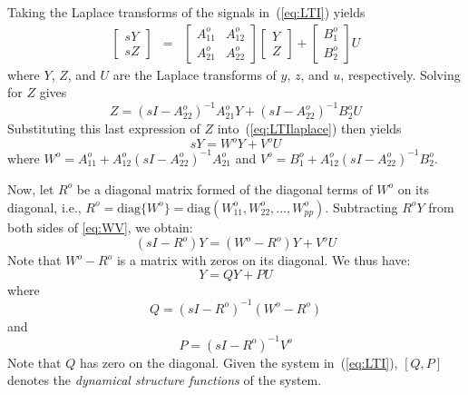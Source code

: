 \documentclass[twocolumn,12pt]{autart}
\theoremstyle{plain}
\begin{document}
Taking the Laplace transforms of the signals in~(\ref{eq:LTI}) yields
\begin{equation}\label{eq:LTIlaplace}
 \begin{array}{lll}
   \left[\begin{array}{c}s{Y}\\s{Z} \end{array}\right]& = & \left[\begin{array}{cc}{A}^o_{11}&{A}^o_{12}\\{A}^o_{21}&{A}^o_{22}\end{array}\right]\left[\begin{array}{c}{Y}\\{Z}\end{array}\right] +\left[\begin{array}{c} {B}^o_{1}\\{B}^o_{2}\end{array}\right]{U}
     \end{array}
\end{equation}
where ${Y}$, ${Z}$, and ${U}$ are the Laplace
transforms of ${y}$, ${z}$, and ${u}$, respectively.
Solving for ${Z}$ gives
$${Z}=\left ( s{I} - {A}^o_{22} \right )^{-1}
{A}^o_{21} {Y} + \left ( s{I} - {A}^o_{22}
\right )^{-1} {B}^o_{2} {U}$$
Substituting this last expression of ${Z}$ into~(\ref{eq:LTIlaplace}) then yields
\begin{equation}
\label{eq:WV} s{Y} = {W}^o {Y} + {V}^o{U}
\end{equation}
where ${W}^o={A}^o_{11} + {A}^o_{12}\left ( s{I} -
  {A}^o_{22} \right )^{-1} {A}^o_{21}$ and
${V}^o={B}^o_{1} +{A}^o_{12}\left ( s{I} - {A}^o_{22} \right
)^{-1} {B}^o_{2}$.

Now, let ${R}^o$ be a
diagonal matrix formed of the diagonal terms of ${W}^o$ on its
diagonal, i.e., ${R}^o=\mbox{diag}\{{W}^o\} =
\mbox{diag}(W^o_{11}, W^o_{22}, ..., W^o_{pp})$. Subtracting ${R}^o{Y}$ from both sides of \eqref{eq:WV}, we obtain:
$$\left ( s{I} - {R}^o \right ) {Y} = \left (
  {W}^o-{R}^o \right ) {Y} + {V}^o {U}$$
Note that ${W}^o-{R}^o$ is a matrix with zeros on its
diagonal. We thus have:
\begin{equation}
  \label{eq:PQ} {Y} =  {QY} + {PU}
\end{equation}
where
\begin{equation}\label{eq:Q}
  {Q} = \left ( s{I} - {R}^o \right )^{-1} \left (
    {W}^o-{R}^o \right )
\end{equation}
and
\begin{equation}\label{eq:P}
  {P}=\left ( s{I}- {R}^o \right )^{-1} {V}^o
\end{equation}
Note that ${Q}$ has zero on the diagonal. Given the system in~(\ref{eq:LTI}), $[{Q},{P}]$ denotes the {\it dynamical structure functions} of the system.
\end{document}
